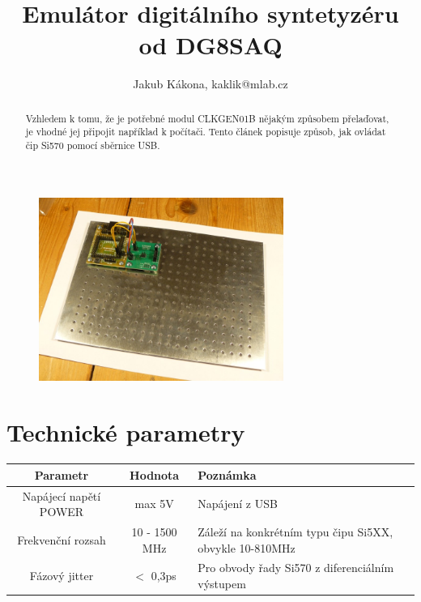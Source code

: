 \documentclass[12pt,a4paper,oneside]{article}
\begin{document}
\title{Emulátor digitálního syntetyzéru od DG8SAQ}
\author{Jakub Kákona, kaklik@mlab.cz}
\maketitle

\thispagestyle{empty}
\begin{abstract}
Vzhledem k tomu, že je potřebné modul CLKGEN01B nějakým způsobem přelaďovat, je vhodné jej připojit například k počítači. Tento článek popisuje způsob, jak ovládat čip Si570 pomocí sběrnice USB. 
\end{abstract}

\begin{figure} [htbp]
\begin{center}
\includegraphics [width=80mm] {DG8SAQ_emulator_Big.jpg} 
\end{center}
\end{figure}

\tableofcontents

\section{Technické parametry}
\begin{table}[htbp]
\begin{center}
\begin{tabular}{|c|c|p{4.7cm}|}
\hline
Parametr & Hodnota & Poznámka \\
\hline
Napájecí napětí POWER  & max 5V &  Napájení z USB\\ 
\hline
Frekvenční rozsah  & 10 - 1500 MHz & Záleží na konkrétním typu čipu Si5XX, obvykle 10-810MHz \\ 
\hline
Fázový jitter  & $<$ 0,3ps & Pro obvody řady Si570 z diferenciálním výstupem\\ 
\hline
\end{tabular}
\end{center}
\end{table}
\end{document}
